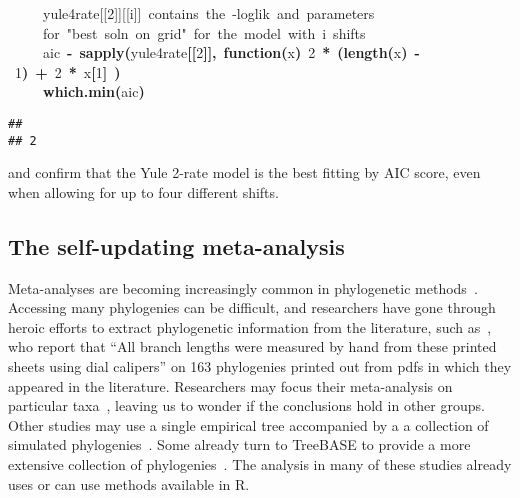 \documentclass{elsarticle}
\makeatletter
\newcommand{\hlnumber}[1]{\textcolor[rgb]{0,0,0}{#1}}%
\newcommand{\hlfunctioncall}[1]{\textcolor[rgb]{.5,0,.33}{\textbf{#1}}}%
\newcommand{\hlkeyword}[1]{\textbf{#1}}%
\newcommand{\hlargument}[1]{\textcolor[rgb]{.69,.25,.02}{#1}}%
\newcommand{\hlcomment}[1]{\textcolor[rgb]{.18,.6,.34}{#1}}%
\newcommand{\hlformalargs}[1]{\hlargument{#1}}%
\newcommand{\hlassignement}[1]{\textbf{#1}}%
\newcommand{\hlsymbol}[1]{#1}%
\newcommand{\hlstd}[1]{\textcolor[rgb]{0,0,0}{#1}}%
\newenvironment{kframe}{%
 \def\FrameCommand##1{\hskip\@totalleftmargin \hskip-\fboxsep
 \colorbox{shadecolor}{##1}\hskip-\fboxsep
     \hskip-\linewidth \hskip-\@totalleftmargin \hskip\columnwidth}%
 \MakeFramed {\advance\hsize-\width
   \@totalleftmargin\z@ \linewidth\hsize
   \@setminipage}}%
 {\par\unskip\endMakeFramed}
\newenvironment{knitrout}{}{} %
\makeatother
\begin{document}
\begin{knitrout}
{\begin{kframe}
\begin{flushleft}
\hlstd{}{\ }{\ }{\ }{\ }{\ }\hlcomment{\usebox{\hlnormalsizeboxhash}{\ }yule\usebox{\hlnormalsizeboxunderscore}4rate[[2]][[i]]{\ }contains{\ }the{\ }-loglik{\ }and{\ }parameters{\ }}\hspace*{\fill}\\
\hlstd{}{\ }{\ }{\ }{\ }{\ }\hlcomment{\usebox{\hlnormalsizeboxhash}{\ }for{\ }"{}best{\ }soln{\ }on{\ }grid"{}{\ }for{\ }the{\ }model{\ }with{\ }i{\ }shifts}\hspace*{\fill}\\
\hlstd{}{\ }{\ }{\ }{\ }{\ }\hlsymbol{aic}{\ }\hlassignement{\usebox{\hlnormalsizeboxlessthan}-}{\ }\hlfunctioncall{sapply}\hlkeyword{(}\hlsymbol{yule\usebox{\hlnormalsizeboxunderscore}4rate}\hlkeyword{[[}\hlnumber{2}\hlkeyword{]}\hlkeyword{]}\hlkeyword{,}{\ }\hlkeyword{function}\hlkeyword{(}\hlformalargs{x}\hlkeyword{)}{\ }\hlnumber{2}{\ }\hlkeyword{*}{\ }\hlkeyword{(}\hlfunctioncall{length}\hlkeyword{(}\hlsymbol{x}\hlkeyword{)}{\ }\hlkeyword{-}{\ }\hlnumber{1}\hlkeyword{)}{\ }\hlkeyword{+}{\ }\hlnumber{2}{\ }\hlkeyword{*}{\ }\hlsymbol{x}\hlkeyword{[}\hlnumber{1}\hlkeyword{]}{\ }\hlkeyword{)}\hspace*{\fill}\\
\hlstd{}{\ }{\ }{\ }{\ }{\ }\hlfunctioncall{which.min}\hlkeyword{(}\hlsymbol{aic}\hlkeyword{)}\mbox{}
\normalfont
\end{flushleft}
\begin{verbatim}
##   
## 2 
\end{verbatim}
\end{kframe}}
\end{knitrout}

and confirm that the Yule 2-rate 
model is the best fitting by AIC score, 
even when allowing for up to four different shifts.  

\subsection{The self-updating meta-analysis}
Meta-analyses are becoming increasingly common in phylogenetic methods~\citep[\emph{e.g}][]{McPeek2007, Phillimore2008, McPeek2008,Quental2010, Davies2011a}.  
Accessing many phylogenies can be difficult, 
and researchers have gone through heroic efforts to extract phylogenetic information from the literature, 
such as~\citet{McPeek2007}, who report that 
``All branch lengths were measured by hand from these printed sheets using dial calipers'' 
on 163 phylogenies printed out from pdfs in which they appeared in the literature.  
Researchers may focus their meta-analysis on particular taxa~\citep{Phillimore2008}, 
leaving us to wonder if the conclusions hold in other groups.  
Other studies may use a single empirical tree accompanied by a a collection of simulated phylogenies~\citet{Cusimano2010}.  
Some already turn to TreeBASE to provide a more extensive collection of phylogenies~\citep{Davies2011a}.  
The analysis in many of these studies already uses or can use methods available in R.  
\end{document}
